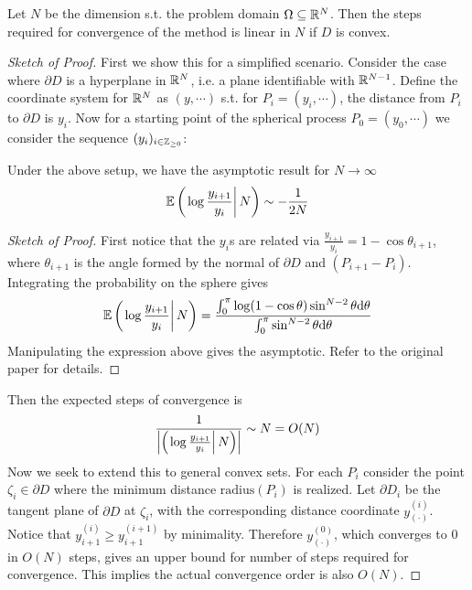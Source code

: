 \documentclass[10pt]{article}
\begin{document}
\begin{theorem}
    Let $N$ be the dimension s.t. the problem domain $\Omega \subseteq \mathbb{R}^N$. Then the steps required for convergence of the method is linear in $N$ if $D$ is convex. 
\end{theorem}

\begin{proof}[Sketch of Proof]
    First we show this for a simplified scenario. Consider the case where $\partial D$ is a hyperplane in $\mathbb{R}^N$, i.e. a plane identifiable with $\mathbb{R}^{N - 1}$. Define the coordinate system for $\mathbb{R}^N$ as $(y, \cdots)$ s.t. for $P_i = (y_i, \cdots)$, the distance from $P_i$ to $\partial D$ is $y_i$. Now for a starting point of the spherical process $P_0 = (y_0, \cdots)$ we consider the sequence $(y_i)_{i \in \mathbb{Z}_{\geq 0}}$:

    \begin{paraindent}
        \begin{lemma}
            Under the above setup, we have the asymptotic result for $N \to \infty$
            \[
                \mathbb{E}\left( \left. \log \frac{y_{i+1}}{y_i} \right| N \right) \sim -\frac{1}{2N}
            \]
        \end{lemma}

        \begin{proof}[Sketch of Proof]
            First notice that the $y_{i}$s are related via $\frac{y_{i+1}}{y_i} = 1 - \cos \theta_{i+1}$, where $\theta_{i+1}$ is the angle formed by the normal of $\partial D$ and $(P_{i+1} - P_i)$. Integrating the probability on the sphere gives
            \[
                \mathbb{E}\left( \left. \log \frac{y_{i+1}}{y_i} \right| N \right) = \frac{\int_{0}^{\pi} \log (1 - \cos \theta) \sin^{N-2} \theta \mathrm{d} \theta}{\int_0^{\pi} \sin^{N-2} \theta \mathrm{d} \theta}
            \]
            Manipulating the expression above gives the asymptotic. Refer to the original paper for details.
        \end{proof}
    \end{paraindent}

    Then the expected steps of convergence is 
    \[
        \frac{1}{ \left|\left( \left. \log \frac{y_{i+1}}{y_i} \right| N \right)\right|} \sim N = O(N) 
    \]
    Now we seek to extend this to general convex sets. For each $P_i$ consider the point $\zeta_i \in \partial D$ where the minimum distance $\text{radius}(P_i)$ is realized. Let $\partial D_i$ be the tangent plane of $\partial D$ at $\zeta_i$, with the corresponding distance coordinate $y_{(\cdot)}^{(i)}$. Notice that $y_{i+1}^{(i)} \geq y_{i+1}^{(i+1)}$ by minimality. Therefore $y_{(\cdot)}^{(0)}$, which converges to 0 in $O(N)$ steps, gives an upper bound for number of steps required for convergence. This implies the actual convergence order is also $O(N)$. 
\end{proof}
\end{document}
